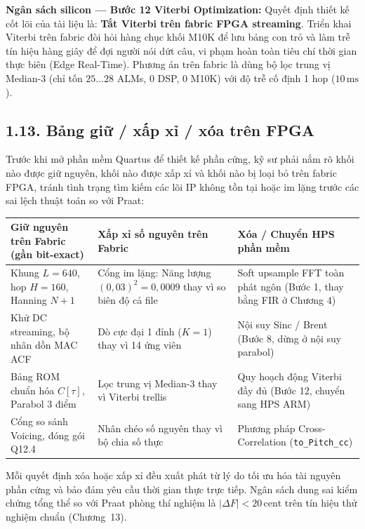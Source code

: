 \begin{costbox}
\textbf{Ngân sách silicon --- Bước 12 Viterbi Optimization:}
Quyết định thiết kế cốt lõi của tài liệu là: \textbf{Tắt Viterbi trên fabric FPGA streaming}. Triển khai Viterbi trên fabric đòi hỏi hàng chục khối M10K để lưu bảng con trỏ và làm trễ tín hiệu hàng giây để đợi người nói dứt câu, vi phạm hoàn toàn tiêu chí thời gian thực biên (Edge Real-Time). Phương án trên fabric là dùng bộ lọc trung vị Median-3 (chỉ tốn $25 \ldots 28$ ALMs, 0 DSP, 0 M10K) với độ trễ cố định 1 hop ($10\,\text{ms}$).
\end{costbox}

\subsection*{1.13. Bảng giữ / xấp xỉ / xóa trên FPGA}

Trước khi mở phần mềm Quartus để thiết kế phần cứng, kỹ sư phải nắm rõ khối nào được giữ nguyên, khối nào được xấp xỉ và khối nào bị loại bỏ trên fabric FPGA, tránh tình trạng tìm kiếm các lõi IP không tồn tại hoặc im lặng trước các sai lệch thuật toán so với Praat:

\begin{center}\small
\begin{tabular}{@{}p{4.2cm}p{4.4cm}p{4.2cm}@{}}\toprule
\textbf{Giữ nguyên trên Fabric (gần bit-exact)} & \textbf{Xấp xỉ số nguyên trên Fabric} & \textbf{Xóa / Chuyển HPS phần mềm} \\
\midrule
Khung $L=640$, hop $H=160$, Hanning $N+1$ & Cổng im lặng: Năng lượng $(0{,}03)^2 = 0{,}0009$ thay vì so biên độ cả file & Soft upsample FFT toàn phát ngôn (Bước 1, thay bằng FIR ở Chương 4) \\
Khử DC streaming, bộ nhân dồn MAC ACF & Dò cực đại 1 đỉnh ($K=1$) thay vì 14 ứng viên & Nội suy Sinc / Brent (Bước 8, dừng ở nội suy parabol) \\
Bảng ROM chuẩn hóa $C[\tau]$, Parabol 3 điểm & Lọc trung vị Median-3 thay vì Viterbi trellis & Quy hoạch động Viterbi đầy đủ (Bước 12, chuyển sang HPS ARM) \\
Cổng so sánh Voicing, đóng gói Q12.4 & Nhân chéo số nguyên thay vì bộ chia số thực & Phương pháp Cross-Correlation (\texttt{to\_Pitch\_cc}) \\
\bottomrule
\end{tabular}
\end{center}

Mỗi quyết định xóa hoặc xấp xỉ đều xuất phát từ lý do tối ưu hóa tài nguyên phần cứng và bảo đảm yêu cầu thời gian thực trực tiếp. Ngân sách dung sai kiểm chứng tổng thể so với Praat phòng thí nghiệm là $|\Delta F| < 20\,\text{cent}$ trên tín hiệu thử nghiệm chuẩn (Chương~13).

